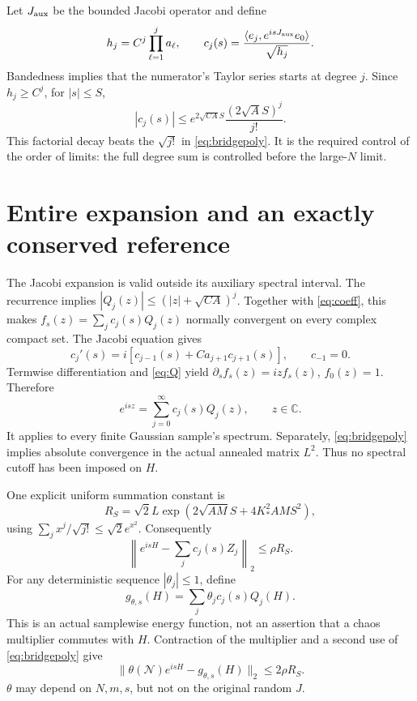 \documentclass[11pt,a4paper]{article}
\newcommand{\NN}{\mathcal N}
\begin{document}
Let $J_{\rm aux}$ be the bounded Jacobi operator and define
\begin{equation}
 h_j=C^j\prod_{\ell=1}^j a_\ell,\qquad
 c_j(s)=\frac{\langle e_j,e^{isJ_{\rm aux}}e_0\rangle}{\sqrt{h_j}}.
\end{equation}
Bandedness implies that the numerator's Taylor series starts at
degree $j$. Since $h_j\ge C^j$, for $|s|\le S$,
\begin{equation}
 |c_j(s)|\le e^{2\sqrt{CA}S}\frac{(2\sqrt A S)^j}{j!}.
 \label{eq:coeff}
\end{equation}
This factorial decay beats the $\sqrt{j!}$ in
\eqref{eq:bridgepoly}. It is the required control of the order of
limits: the full degree sum is controlled before the large-$N$ limit.

\newpage
\section{Entire expansion and an exactly conserved reference}
The Jacobi expansion is valid outside its auxiliary spectral interval.
The recurrence implies
$|Q_j(z)|\le(|z|+\sqrt{CA})^j$. Together with \eqref{eq:coeff},
this makes $f_s(z)=\sum_jc_j(s)Q_j(z)$ normally convergent on every
complex compact set. The Jacobi equation gives
\begin{equation}
 c_j'(s)=i[c_{j-1}(s)+Ca_{j+1}c_{j+1}(s)],\qquad c_{-1}=0.
\end{equation}
Termwise differentiation and \eqref{eq:Q} yield
$\partial_s f_s(z)=izf_s(z)$, $f_0(z)=1$. Therefore
\begin{equation}
 e^{isz}=\sum_{j=0}^\infty c_j(s)Q_j(z),\qquad z\in\mathbb C.
\end{equation}
It applies to every finite Gaussian sample's spectrum. Separately,
\eqref{eq:bridgepoly} implies absolute convergence in the actual
annealed matrix $L^2$. Thus no spectral cutoff has been imposed on $H$.

One explicit uniform summation constant is
\begin{equation}
 R_S=\sqrt2 L\exp\!\left(2\sqrt{AM}S+4K_*^2AM S^2\right),
\end{equation}
using $\sum_jx^j/\sqrt{j!}\le\sqrt2e^{x^2}$. Consequently
\begin{equation}
 \left\|e^{isH}-\sum_jc_j(s)Z_j\right\|_2\le\rho R_S.
\end{equation}
For any deterministic sequence $|\theta_j|\le1$, define
\begin{equation}
 g_{\theta,s}(H)=\sum_j\theta_jc_j(s)Q_j(H).
\end{equation}
This is an actual samplewise energy function, not an assertion that
a chaos multiplier commutes with $H$. Contraction of the multiplier
and a second use of \eqref{eq:bridgepoly} give
\begin{equation}
 \boxed{\quad
 \|\theta(\NN)e^{isH}-g_{\theta,s}(H)\|_2\le2\rho R_S.
 \quad}
 \label{eq:multiplier}
\end{equation}
$\theta$ may depend on $N,m,s$, but not on the original random $J$.
\end{document}
